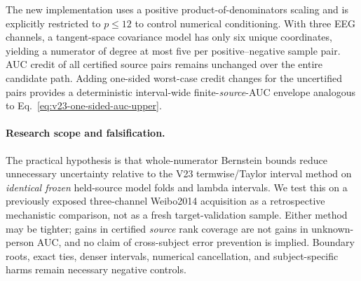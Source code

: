 The new implementation uses a positive product-of-denominators
scaling and is explicitly restricted to $p\le12$ to
control numerical conditioning. With three EEG channels,
a tangent-space covariance model has only six unique
coordinates, yielding a numerator of degree at most
five per positive--negative sample pair. AUC credit of
all certified source pairs remains unchanged over the
entire candidate path. Adding one-sided worst-case
credit changes for the uncertified pairs provides a
deterministic interval-wide finite-\emph{source}-AUC
envelope analogous to Eq.~\eqref{eq:v23-one-sided-auc-upper}.

\paragraph{Research scope and falsification.}
The practical hypothesis is that whole-numerator
Bernstein bounds reduce unnecessary uncertainty relative
to the V23 termwise/Taylor interval method on
\emph{identical frozen} held-source model folds and
lambda intervals. We test this on a previously exposed
three-channel Weibo2014 acquisition as a retrospective
mechanistic comparison, not as a fresh target-validation
sample. Either method may be tighter; gains in certified
\emph{source} rank coverage are not gains in unknown-person
AUC, and no claim of cross-subject error prevention
is implied. Boundary roots, exact ties, denser intervals,
numerical cancellation, and subject-specific harms remain
necessary negative controls.
